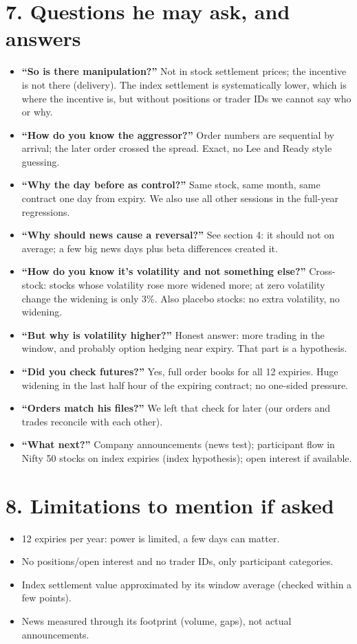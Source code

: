 \documentclass[11pt]{article}
\begin{document}
\section*{7. Questions he may ask, and answers}
\begin{itemize}
  \item \textbf{``So is there manipulation?''} Not in stock settlement prices; the incentive
  is not there (delivery). The index settlement is systematically lower, which is where the
  incentive is, but without positions or trader IDs we cannot say who or why.
  \item \textbf{``How do you know the aggressor?''} Order numbers are sequential by arrival; the
  later order crossed the spread. Exact, no Lee and Ready style guessing.
  \item \textbf{``Why the day before as control?''} Same stock, same month, same contract one
  day from expiry. We also use all other sessions in the full-year regressions.
  \item \textbf{``Why should news cause a reversal?''} See section 4: it should not on average;
  a few big news days plus beta differences created it.
  \item \textbf{``How do you know it's volatility and not something else?''} Cross-stock: stocks
  whose volatility rose more widened more; at zero volatility change the widening is only 3\%.
  Also placebo stocks: no extra volatility, no widening.
  \item \textbf{``But why is volatility higher?''} Honest answer: more trading in the window,
  and probably option hedging near expiry. That part is a hypothesis.
  \item \textbf{``Did you check futures?''} Yes, full order books for all 12 expiries. Huge
  widening in the last half hour of the expiring contract; no one-sided pressure.
  \item \textbf{``Orders match his files?''} We left that check for later (our orders and trades
  reconcile with each other).
  \item \textbf{``What next?''} Company announcements (news test); participant flow in Nifty 50
  stocks on index expiries (index hypothesis); open interest if available.
\end{itemize}

\section*{8. Limitations to mention if asked}
\begin{itemize}
  \item 12 expiries per year: power is limited, a few days can matter.
  \item No positions/open interest and no trader IDs, only participant categories.
  \item Index settlement value approximated by its window average (checked within a few points).
  \item News measured through its footprint (volume, gaps), not actual announcements.
\end{itemize}
\end{document}
